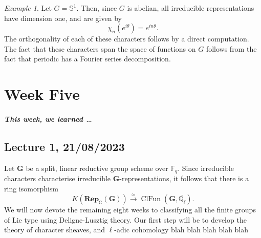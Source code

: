 \documentclass[a4paper]{report}
\theoremstyle{definition}
\theoremstyle{remark}
\theoremstyle{proposition}
\theoremstyle{conjecture}
\theoremstyle{lemma}
\theoremstyle{corollary}
\theoremstyle{exercise}
\theoremstyle{example}
\newtheorem{example}{Example}
\newcommand{\C}{\mathbb{C}}
\newcommand{\on}{\operatorname}
\begin{document}
\begin{example}
    Let $G = \mathbb{S}^1$. Then, since $G$ is abelian, all irreducible 
    representations have dimension one, and are given by 
    $$\chi_n(e^{i\theta}) = e^{in\theta}.$$
    The orthogonality of each of these characters follows by a direct 
    computation.
    The fact that these characters span the space of functions on $G$
    follows from the fact that periodic has a Fourier series decomposition.
\end{example}

\chapter{Week Five}

\paragraph{This week, we learned \ldots}

\section{Lecture 1, 21/08/2023}

Let $\mathbf{G}$ be a split, linear reductive group scheme over 
$\mathbb{F}_q$. Since irreducible characters characterise irreducible 
$\mathbf{G}$-representations, it follows that there is a ring isomorphism
$$K(\mathbf{Rep}_\C(\mathbf{G})) \stackrel{\simeq}{\longrightarrow} \on{ClFun}(\mathbf{G},\overline{\mathbb{Q}_\ell}).$$
We will now devote the remaining eight weeks to classifying all the finite
groups of Lie type using Deligne-Lusztig theory. Our first step will
be to develop the theory of character sheaves, and $\ell$-adic cohomology
blah blah blah blah blah
\end{document}
